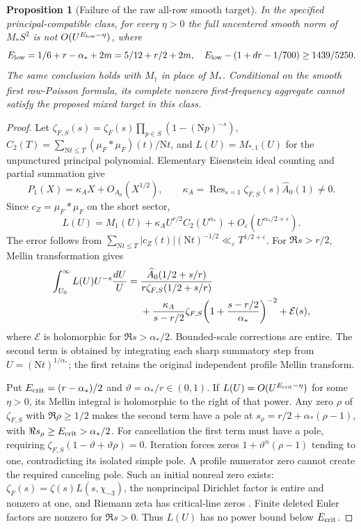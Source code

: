 \documentclass[11pt]{article}
\newtheorem{proposition}[theorem]{Proposition}
\theoremstyle{definition}
\newcommand{\N}{\mathrm N}
\newcommand{\eps}{\varepsilon}
\begin{document}
\begin{proposition}[Failure of the raw all-row smooth target]
\label{sq-principal-obstruction}
In the specified principal-compatible class, for every $\eta>0$ the
full uncentered smooth norm of $M_*S^2$ is not
$O(U^{E_{\rm low}-\eta})$, where
\begin{equation}\label{sq-obstruction-exponent}
 E_{\rm low}=1/6+r-\alpha_*+2m=5/12+r/2+2m,
 \quad E_{\rm low}-(1+dr-1/700)\ge1439/5250.
\end{equation}
The same conclusion holds with $M_\dagger$ in place of $M_*$.
Conditional on the smooth first row-Poisson formula, its complete
nonzero first-frequency aggregate cannot satisfy the proposed mixed
target in this class.
\end{proposition}
\begin{proof}
Let $\zeta_{F,S}(s)=\zeta_F(s)\prod_{p\in S}(1-(\N p)^{-s})$,
$C_2(T)=\sum_{\N t\le T}(\mu_F*\mu_F)(t)/\N t$, and
$L(U)=M_{*,1}(U)$ for the unpunctured principal polynomial.
Elementary Eisenstein ideal counting and partial summation give
\[
 P_1(X)=\kappa_A X+O_{A_0}(X^{1/2}),\qquad
 \kappa_A=\operatorname{Res}_{s=1}\zeta_{F,S}(s)\widehat A_0(1)\ne0.
\]
Since $c_Z=\mu_F*\mu_F$ on the short sector,
\begin{equation}\label{sq-principal-reconstruction}
 L(U)=M_1(U)+\kappa_A U^{r/2}C_2(U^{\alpha_*})
                         +O_\eps(U^{\alpha_*/2+\eps}).
\end{equation}
The error follows from
$\sum_{\N t\le T}|c_Z(t)|(\N t)^{-1/2}\ll_\eps T^{1/2+\eps}$.
For $\Re s>r/2$, Mellin transformation gives
\begin{align}\label{sq-principal-mellin}
 \int_{U_0}^\infty L(U)U^{-s}\frac{dU}{U}
 ={}&\frac{\widehat A_0(1/2+s/r)}{r\zeta_{F,S}(1/2+s/r)}\notag\\
 &+\frac{\kappa_A}{s-r/2}
 \zeta_{F,S}\!\left(1+\frac{s-r/2}{\alpha_*}\right)^{-2}
 +\mathcal E(s),
\end{align}
where $\mathcal E$ is holomorphic for $\Re s>\alpha_*/2$.
Bounded-scale corrections are entire. The second term is obtained by
integrating each sharp summatory step from $U=(\N t)^{1/\alpha_*}$;
the first retains the original independent profile Mellin transform.

Put $E_{\rm crit}=(r-\alpha_*)/2$ and $\vartheta=\alpha_*/r\in(0,1)$.
If $L(U)=O(U^{E_{\rm crit}-\eta})$ for some $\eta>0$, its Mellin
integral is holomorphic to the right of that power. Any zero $\rho$
of $\zeta_{F,S}$ with $\Re\rho\ge1/2$ makes the second term have a
pole at $s_\rho=r/2+\alpha_*(\rho-1)$, with
$\Re s_\rho\ge E_{\rm crit}>\alpha_*/2$.
For cancellation the first term must have a pole, requiring
$\zeta_{F,S}(1-\vartheta+\vartheta\rho)=0$.
Iteration forces zeros $1+\vartheta^n(\rho-1)$ tending to one,
contradicting its isolated simple pole. A profile numerator zero cannot
create the required canceling pole. Such an initial nonreal zero exists:
$\zeta_F(s)=\zeta(s)L(s,\chi_{-3})$, the nonprincipal Dirichlet factor
is entire and nonzero at one, and Riemann zeta has critical-line zeros
\cite{zeta-classical}. Finite deleted Euler factors are nonzero for
$\Re s>0$. Thus $L(U)$ has no power bound below $E_{\rm crit}$.


\end{proof}
\end{document}
